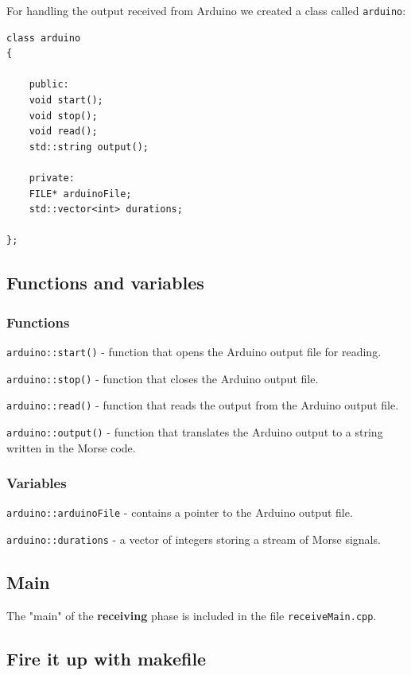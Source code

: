\documentclass[12pt]{report}
\begin{document}
For handling the output received from Arduino we created a class called \verb|arduino|:

\begin{lstlisting}
class arduino
{

	public:
	void start();
	void stop();
	void read();
	std::string output();

	private:
	FILE* arduinoFile;
	std::vector<int> durations;
	
};
\end{lstlisting}

\subsection{Functions and variables}

\subsubsection{Functions}

\verb|arduino::start()| - function that opens the Arduino output file for reading.

\verb|arduino::stop()| - function that closes the Arduino output file.

\verb|arduino::read()| - function that reads the output from the Arduino output file.

\verb|arduino::output()| - function that translates the Arduino output to a string written in the Morse code.

\subsubsection{Variables}

\verb|arduino::arduinoFile| - contains a pointer to the Arduino output file.

\verb|arduino::durations| - a vector of integers storing a stream of Morse signals.

\subsection{Main}

The "main" of the \textbf{receiving} phase is included in the file \verb|receiveMain.cpp|. 

\subsection{Fire it up with makefile}
\end{document}
